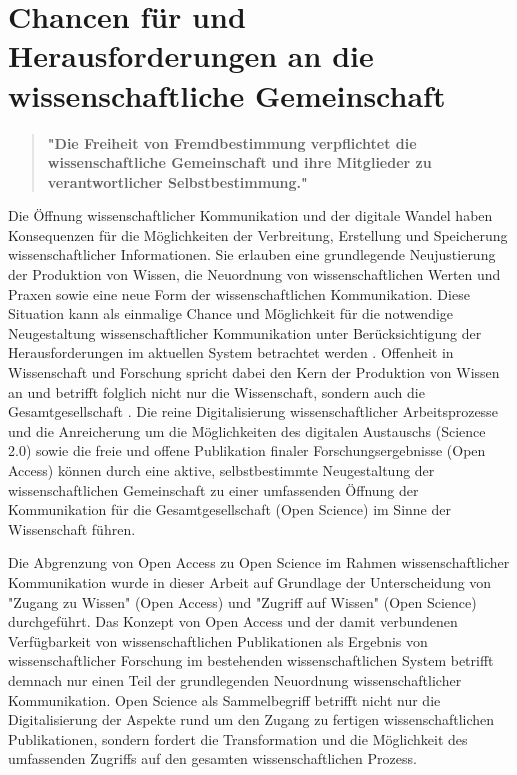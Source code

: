\section{Chancen für und Herausforderungen an die wissenschaftliche Gemeinschaft}

\begin{quote}
\textbf{"Die Freiheit von Fremdbestimmung verpflichtet die wissenschaftliche Gemeinschaft und ihre Mitglieder zu verantwortlicher Selbstbestimmung."}
\end{quote} \cite{Oezmen_2015}

Die Öffnung wissenschaftlicher Kommunikation und der digitale Wandel haben Konsequenzen für die Möglichkeiten der Verbreitung, Erstellung und Speicherung wissenschaftlicher Informationen. Sie erlauben eine grundlegende Neujustierung der Produktion von Wissen, die Neuordnung von wissenschaftlichen Werten und Praxen sowie eine neue Form der wissenschaftlichen Kommunikation. Diese Situation kann als einmalige Chance und Möglichkeit für die notwendige Neugestaltung wissenschaftlicher Kommunikation unter Berücksichtigung der Herausforderungen im aktuellen System betrachtet werden \cite{Naeder_2010}. Offenheit in Wissenschaft und Forschung spricht dabei den Kern der Produktion von Wissen an und betrifft folglich nicht nur die Wissenschaft, sondern auch die Gesamtgesellschaft \cite{Mussell_2013}. Die reine Digitalisierung wissenschaftlicher Arbeitsprozesse und die Anreicherung um die Möglichkeiten des digitalen Austauschs (Science 2.0) sowie die freie und offene Publikation finaler Forschungsergebnisse (Open Access) können durch eine aktive, selbstbestimmte Neugestaltung der wissenschaftlichen Gemeinschaft zu einer umfassenden Öffnung der Kommunikation für die Gesamtgesellschaft (Open Science) im Sinne der Wissenschaft führen.

Die Abgrenzung von Open Access zu Open Science im Rahmen wissenschaftlicher Kommunikation wurde in dieser Arbeit auf Grundlage der Unterscheidung von "Zugang zu Wissen" (Open Access) und "Zugriff auf Wissen" (Open Science) durchgeführt. Das Konzept von Open Access und der damit verbundenen Verfügbarkeit von wissenschaftlichen Publikationen als Ergebnis von wissenschaftlicher Forschung im bestehenden wissenschaftlichen System betrifft demnach nur einen Teil der grundlegenden Neuordnung wissenschaftlicher Kommunikation. Open Science als Sammelbegriff betrifft nicht nur die Digitalisierung der Aspekte rund um den Zugang zu fertigen wissenschaftlichen Publikationen, sondern fordert die Transformation und die Möglichkeit des umfassenden Zugriffs auf den gesamten wissenschaftlichen Prozess.


